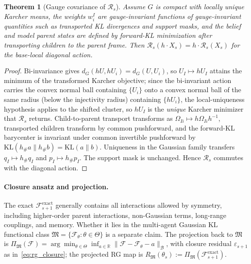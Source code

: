 \documentclass[11pt]{article}
\newtheorem{theorem}{Theorem}
\begin{document}
\begin{theorem}[Gauge covariance of $\mathcal{R}_s$]
\label{thm:rg_covariance}
Assume $G$ is compact with locally unique Karcher means, the weights $w_i^I$ are gauge-invariant functions of gauge-invariant quantities such as transported KL divergences and support masks, and the belief and model parent states are defined by forward-KL minimization after transporting children to the parent frame. Then $\mathcal{R}_s(h \cdot X_s) = h \cdot \mathcal{R}_s(X_s)$ for the base-local diagonal action.
\end{theorem}

\begin{proof}
Bi-invariance gives $d_G(hU, hU_i) = d_G(U, U_i)$, so $U_I \mapsto hU_I$ attains the minimum of the transformed Karcher objective; since the bi-invariant action carries the convex normal ball containing $\{U_i\}$ onto a convex normal ball of the same radius (below the injectivity radius) containing $\{hU_i\}$, the local-uniqueness hypothesis applies to the shifted cluster, so $hU_I$ is the \emph{unique} Karcher minimizer that $\mathcal{R}_s$ returns. Child-to-parent transport transforms as $\Omega_{Ii} \mapsto h\Omega_{Ii}h^{-1}$, transported children transform by common pushforward, and the forward-KL barycenter is invariant under common invertible pushforward by $\mathrm{KL}(h_\# a \| h_\# b) = \mathrm{KL}(a \| b)$. Uniqueness in the Gaussian family transfers $q_I \mapsto h_\# q_I$ and $p_I \mapsto h_\# p_I$. The support mask is unchanged. Hence $\mathcal{R}_s$ commutes with the diagonal action.
\end{proof}

\paragraph{Closure ansatz and projection.}
The exact $\mathcal{F}_{s+1}^{\mathrm{exact}}$ generally contains all interactions allowed by symmetry, including higher-order parent interactions, non-Gaussian terms, long-range couplings, and memory. Whether it lies in the multi-agent Gaussian KL functional class $\mathfrak{M} = \{\mathcal{F}_\theta : \theta \in \Theta\}$ is a separate claim. The projection back to $\mathfrak{M}$ is $\Pi_\mathfrak{M}(\mathcal{F}) = \arg\min_{\theta \in \Theta} \inf_{a \in \mathbb{R}}\|\mathcal{F} - \mathcal{F}_\theta - a\|_\mathcal{B}$, with closure residual $\varepsilon_{s+1}$ as in~\eqref{eq:rg_closure}; the projected RG map is $R_\mathfrak{M}(\theta_s) := \Pi_\mathfrak{M}(\mathcal{F}_{s+1}^{\mathrm{exact}})$.
\end{document}
